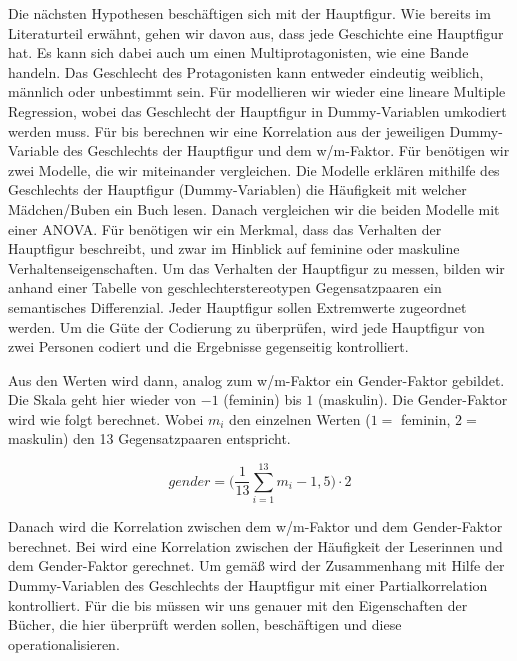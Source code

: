 Die nächsten Hypothesen beschäftigen sich mit der Hauptfigur. Wie
bereits im Literaturteil erwähnt, gehen wir davon aus, dass jede
Geschichte eine Hauptfigur hat. Es kann sich dabei auch um einen
Multiprotagonisten, wie \zB eine Bande handeln. Das Geschlecht des
Protagonisten kann entweder eindeutig weiblich, männlich oder unbestimmt
sein. Für  modellieren wir wieder eine lineare Multiple
Regression, wobei das Geschlecht der Hauptfigur in Dummy-Variablen
umkodiert werden muss. Für  bis  berechnen wir
eine Korrelation aus der jeweiligen Dummy-Variable des Geschlechts der
Hauptfigur und dem w/m-Faktor. Für  benötigen wir zwei
Modelle, die wir miteinander vergleichen. Die Modelle erklären mithilfe
des Geschlechts der Hauptfigur (Dummy-Variablen) die Häufigkeit mit
welcher Mädchen/Buben ein Buch lesen. Danach vergleichen wir die beiden
Modelle mit einer ANOVA. Für  benötigen wir ein Merkmal, dass
das Verhalten der Hauptfigur beschreibt, und zwar im Hinblick auf
feminine oder maskuline Verhaltenseigenschaften. Um das Verhalten der
Hauptfigur zu messen, bilden wir anhand einer Tabelle von
geschlechterstereotypen Gegensatzpaaren ein semantisches Differenzial.
\parencites[174\psq]{feldmann2006}[93\psqq]{Spillner1974} Jeder
Hauptfigur sollen Extremwerte zugeordnet werden. Um die Güte der
Codierung zu überprüfen, wird jede Hauptfigur von zwei Personen codiert
und die Ergebnisse gegenseitig kontrolliert.



Aus den Werten wird dann, analog zum w/m-Faktor ein Gender-Faktor
gebildet. Die Skala geht hier wieder von $-1$ (feminin) bis $1$
(maskulin). Die Gender-Faktor wird wie folgt berechnet. Wobei $m_i$ den
einzelnen Werten ($1=$ feminin, $2=$ maskulin) den 13 Gegensatzpaaren
entspricht.

\begin{equation} gender=\Bigg(\frac{1}{13}\sum_{i=1}^{13}m_i-1{,}5\Bigg)\cdot 2 \end{equation}

Danach wird die Korrelation zwischen dem w/m-Faktor und dem
Gender-Faktor berechnet. Bei  wird eine Korrelation zwischen
der Häufigkeit der Leserinnen und dem Gender-Faktor gerechnet. Um gemäß
 wird der Zusammenhang mit Hilfe der Dummy-Variablen des
Geschlechts der Hauptfigur mit einer Partialkorrelation kontrolliert.
Für die  bis  müssen wir uns genauer mit den
Eigenschaften der Bücher, die hier überprüft werden sollen, beschäftigen
und diese operationalisieren.

